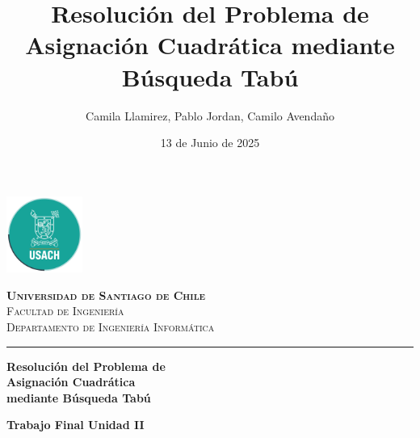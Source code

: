 \documentclass[12pt, a4paper]{article}
\title{Resolución del Problema de Asignación Cuadrática mediante Búsqueda Tabú}
\author{Camila Llamirez, Pablo Jordan, Camilo Avendaño}
\date{13 de Junio de 2025} %
\begin{document}
\begin{titlepage}
    \pagecolor{white}
    
    \begin{center}
        \includegraphics[height=2.5cm]{logo_usach.png} %
        \vspace{0.5cm} %
        
        {\large\bfseries\textsc{\textcolor{usachBlue}{Universidad de Santiago de Chile}}} \\
        {\large\textsc{Facultad de Ingeniería}} \\
        {\large\textsc{Departamento de Ingeniería Informática}} \\
    \end{center}
    
    \vspace{0.0pt} 
    \begin{center}
        \textcolor{usachBlue}{\rule{0.8\textwidth}{1pt}} 
    \end{center}
    \vspace{0.0pt} 
    
    \begin{center}
        \begin{tcolorbox}[
            enhanced,
            colback=white,
            colframe=usachBlue,
            arc=0mm,
            boxrule=1.5pt,
            left=10pt,right=10pt,top=12pt,bottom=12pt,
            boxsep=0pt,
            width=0.95\textwidth
        ]
            \centering
            {\Huge \bfseries \textcolor{usachBlue}{Resolución del Problema de}} \\
            {\Huge \bfseries \textcolor{usachBlue}{Asignación Cuadrática}} \\
            {\Huge \bfseries \textcolor{usachBlue}{mediante Búsqueda Tabú}} \\
        \end{tcolorbox}
    \end{center}
    
    \vspace{1.0cm} 
    \begin{center}
        {\Large\bfseries Trabajo Final Unidad II}\
    \end{center}
    \vspace{2cm} 
    

\end{titlepage}
\end{document}
